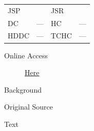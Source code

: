 					\begin{tabular}{p{0.5in}p{1in}p{0.5in}p{1in}}
					JSP	 	& 			& JSR 		&  \\
					DC	 	& ---		& HC 		& --- \\
					HDDC 	& ---		& TCHC 		& --- \\
					\end{tabular}
				
				\begin{description}
					\item[Online Access] \href{https://www.josephsmithpapers.org/paper-summary/letter-to-presendia-huntington-buell-15-march-1839/1}{Here}
				\end{description}
				
				\begin{description}
					\item[Background]
				\end{description}
				
				
				\begin{description}
					\item[Original Source]
				\end{description}
				
				
				\begin{description}
					\item[Text]
				\end{description}
				

